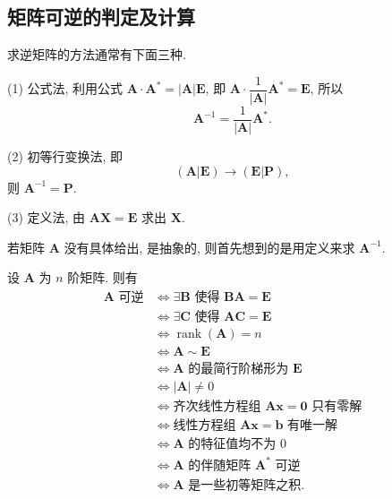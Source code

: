 \documentclass[../../main.tex]{subfiles}%
\begin{document}
\subsection{矩阵可逆的判定及计算}

求逆矩阵的方法通常有下面三种.

(1) 公式法, 利用公式 \(\boldsymbol{A} \cdot \boldsymbol{A}^* = |\boldsymbol{A}|\boldsymbol{E}\), 即 \(\boldsymbol{A} \cdot \dfrac{1}{|\boldsymbol{A}|}\boldsymbol{A}^* = \boldsymbol{E}\), 所以
\[
\boldsymbol{A}^{-1} = \dfrac{1}{|\boldsymbol{A}|}\boldsymbol{A}^*.
\]

(2) 初等行变换法, 即
\[
(\boldsymbol{A} | \boldsymbol{E}) \longrightarrow (\boldsymbol{E} | \boldsymbol{P}),
\]
则 \(\boldsymbol{A}^{-1} = \boldsymbol{P}\).

(3) 定义法, 由 \(\boldsymbol{A}\boldsymbol{X} = \boldsymbol{E}\) 求出 \(\boldsymbol{X}\).

若矩阵 \(\boldsymbol{A}\) 没有具体给出, 是抽象的, 则首先想到的是用定义来求 \(\boldsymbol{A}^{-1}\).

\begin{proposition}
设 \(\boldsymbol{A}\) 为 \(n\) 阶矩阵. 则有
\[
\begin{aligned}
\boldsymbol{A} \text{ 可逆} &\Leftrightarrow \exists \boldsymbol{B} \text{ 使得 } \boldsymbol{BA} = \boldsymbol{E} \\
&\Leftrightarrow \exists \boldsymbol{C} \text{ 使得 } \boldsymbol{AC} = \boldsymbol{E} \\
&\Leftrightarrow \operatorname{rank}(\boldsymbol{A}) = n \\
&\Leftrightarrow \boldsymbol{A} \sim \boldsymbol{E} \\
&\Leftrightarrow \boldsymbol{A} \text{ 的最简行阶梯形为 } \boldsymbol{E} \\
&\Leftrightarrow |\boldsymbol{A}| \neq 0 \\
&\Leftrightarrow \text{齐次线性方程组 } \boldsymbol{Ax} = \boldsymbol{0} \text{ 只有零解} \\
&\Leftrightarrow \text{线性方程组 } \boldsymbol{Ax} = \boldsymbol{b} \text{ 有唯一解} \\
&\Leftrightarrow \boldsymbol{A} \text{ 的特征值均不为 } 0 \\
&\Leftrightarrow \boldsymbol{A} \text{ 的伴随矩阵 } \boldsymbol{A}^* \text{ 可逆} \\
&\Leftrightarrow \boldsymbol{A} \text{ 是一些初等矩阵之积}.
\end{aligned}
\]
\end{proposition}
\end{document}
